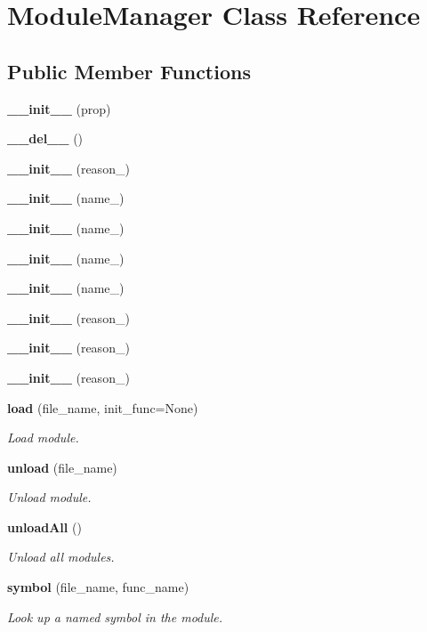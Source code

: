 \section{Module\-Manager Class Reference}
\label{classModuleManager}
\subsection*{Public Member Functions}
\begin{CompactItemize}
\item 
{\bf \_\-\_\-init\_\-\_\-} (prop)
\item 
{\bf \_\-\_\-del\_\-\_\-} ()
\item 
{\bf \_\-\_\-init\_\-\_\-} (reason\_\-)
\item 
{\bf \_\-\_\-init\_\-\_\-} (name\_\-)
\item 
{\bf \_\-\_\-init\_\-\_\-} (name\_\-)
\item 
{\bf \_\-\_\-init\_\-\_\-} (name\_\-)
\item 
{\bf \_\-\_\-init\_\-\_\-} (name\_\-)
\item 
{\bf \_\-\_\-init\_\-\_\-} (reason\_\-)
\item 
{\bf \_\-\_\-init\_\-\_\-} (reason\_\-)
\item 
{\bf \_\-\_\-init\_\-\_\-} (reason\_\-)
\item 
{\bf load} (file\_\-name, init\_\-func=None)
\begin{CompactList}\small\item\em Load module. \item\end{CompactList}\item 
{\bf unload} (file\_\-name)
\begin{CompactList}\small\item\em Unload module. \item\end{CompactList}\item 
{\bf unload\-All} ()
\begin{CompactList}\small\item\em Unload all modules. \item\end{CompactList}\item 
{\bf symbol} (file\_\-name, func\_\-name)
\begin{CompactList}\small\item\em Look up a named symbol in the module. \item\end{CompactList}\item 

\end{CompactItemize}
